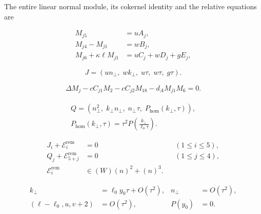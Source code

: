 The entire linear normal module, its cokernel identity and the
relative equations are

\begin{equation}\label{supp:appr3tau:linearmodule}
 \begin{aligned}
 M_{j5}&=uA_j,\\
 M_{j4}-M_{j1}&=wB_j,\\
 M_{j6}+\kappa\ell M_{j1}&=uC_j+wD_j+gE_j,
 \end{aligned}
\end{equation}

\begin{equation}\label{supp:appr3tau:J}
 J=(un_\perp,\;w k_\perp,\;u\tau,\;w\tau,\;g\tau).
\end{equation}

\begin{equation}\label{supp:appr3tau:rangeidentity}
 \begin{aligned}
 \Delta M_j-cC_{j1}M_2-cC_{j2}M_{18}
              -d_AM_{j1}M_6=0 .
 \end{aligned}
\end{equation}

\begin{equation}\label{supp:appr3tau:Q}
 \begin{gathered}
 Q=(n_\perp^2,\;k_\perp n_\perp,\;n_\perp\tau,\;P_{\mathrm{hom}}(k_\perp,\tau)),\\
 P_{\mathrm{hom}}(k_\perp,\tau)=\tau^2P\left(\frac{k_\perp}{\ell_0\tau}\right).
 \end{gathered}
\end{equation}

\begin{equation}\label{supp:appr3tau:relativeform}
 \begin{aligned}
 J_i+\mathcal E_i^{\mathrm{rem}}&=0 &&(1\le i\le5),\\
 Q_j+\mathcal E_{5+j}^{\mathrm{rem}}&=0 &&(1\le j\le4),\\
 \mathcal E_i^{\mathrm{rem}}&\in(W)(n)^2+(n)^3.
 \end{aligned}
\end{equation}

\begin{equation}\label{supp:appr3tau:bounds}
 \begin{aligned}
 k_\perp&=\ell_0y_0\tau+O(\tau^2),& n_\perp&=O(\tau^2),\\
 (\ell-\ell_0,u,v+2)&=O(\tau^2),&P(y_0)&=0.
 \end{aligned}
\end{equation}


